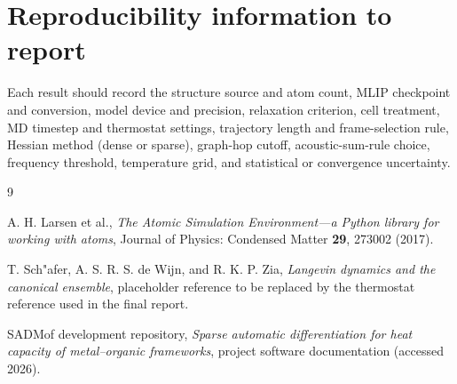 \documentclass[11pt,a4paper]{article}
\begin{document}
\section{Reproducibility information to report}

Each result should record the structure source and atom count, MLIP checkpoint and conversion, model device and precision, relaxation criterion, cell treatment, MD timestep and thermostat settings, trajectory length and frame-selection rule, Hessian method (dense or sparse), graph-hop cutoff, acoustic-sum-rule choice, frequency threshold, temperature grid, and statistical or convergence uncertainty.

\begin{thebibliography}{9}

A. H. Larsen et al., \emph{The Atomic Simulation Environment---a Python library for working with atoms}, Journal of Physics: Condensed Matter \textbf{29}, 273002 (2017).

T. Sch"afer, A. S. R. S. de Wijn, and R. K. P. Zia, \emph{Langevin dynamics and the canonical ensemble}, placeholder reference to be replaced by the thermostat reference used in the final report.

SADMof development repository, \emph{Sparse automatic differentiation for heat capacity of metal--organic frameworks}, project software documentation (accessed 2026).

\end{thebibliography}
\end{document}
